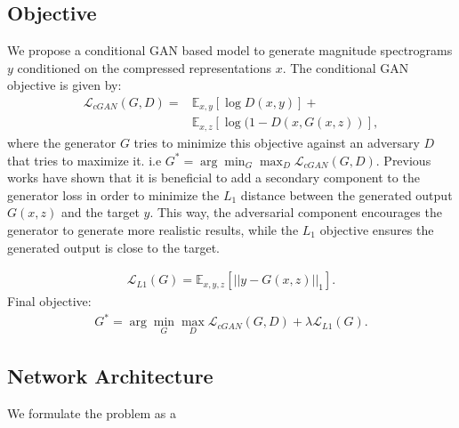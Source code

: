 \documentclass[a4paper]{article}
\begin{document}
\subsection{Objective}
We propose a conditional GAN based model to generate magnitude spectrograms $y$ conditioned on the compressed representations $x$. The conditional GAN objective is given by:
\begin{align}
    \mathcal{L}_{cGAN}(G,D) = &\mathbb{E}_{x,y}[\log D(x,y)] + \nonumber \\
                 &\mathbb{E}_{x,z}[\log (1-D(x,G(x,z))],\label{cGAN_equation}
\end{align}
where the generator $G$ tries to minimize this objective against an adversary $D$ that tries to maximize it. i.e $G^*  = \arg\min_G \max_D \mathcal{L}_{cGAN}(G,D)$. Previous works have shown that it is beneficial to add a secondary component to the generator loss in order to minimize the $L_1$ distance between the generated output $G(x,z)$ and the target $y$. This way, the adversarial component encourages the generator to generate more realistic results,  while the $L_1$ objective ensures the generated output is close to the target.

\begin{align}
    \mathcal{L}_{L1}(G) = \mathbb{E}_{x,y,z}[{||y-G(x,z)||}_1].\label{L1_equation}
\end{align}
Final objective:
\begin{align}
    G^*  = \arg\min_G\max_D \mathcal{L}_{cGAN}(G,D) + \lambda \mathcal{L}_{L1}(G).\label{full_objective}
\end{align}
\subsection{Network Architecture}
We formulate the problem as a 


\end{document}
